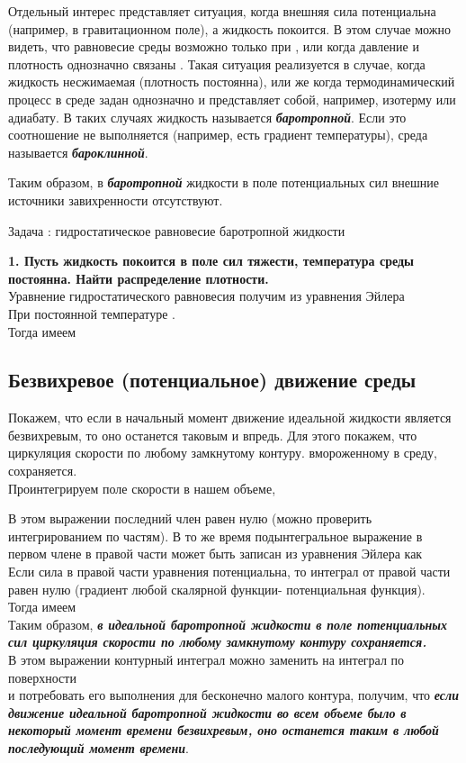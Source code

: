 \documentclass[
]{article}
\begin{document}
Отдельный интерес представляет ситуация, когда внешняя сила потенциальна
(например, в гравитационном поле), а жидкость покоится. В этом случае
можно видеть, что равновесие среды возможно только при {}, или когда
давление и плотность однозначно связаны {}. Такая ситуация реализуется в
случае, когда жидкость несжимаемая (плотность постоянна), или же когда
термодинамический процесс в среде задан однозначно и представляет собой,
например, изотерму или адиабату. В таких случаях жидкость называется
\textbf{\emph{баротропной}}. Если это соотношение не выполняется
(например, есть градиент температуры), среда называется
\textbf{\emph{бароклинной}}.

Таким образом, в \textbf{\emph{баротропной}} жидкости в поле
потенциальных сил внешние источники завихренности отсутствуют.

Задача : гидростатическое равновесие баротропной жидкости

\textbf{1. Пусть жидкость покоится в поле сил тяжести, температура среды
постоянна. Найти распределение плотности.}\\
Уравнение гидростатического равновесия получим из уравнения Эйлера\\
{}При постоянной температуре {}.\\
Тогда имеем {}{}

\subsection{Безвихревое (потенциальное) движение
среды}\label{ux431ux435ux437ux432ux438ux445ux440ux435ux432ux43eux435-ux43fux43eux442ux435ux43dux446ux438ux430ux43bux44cux43dux43eux435-ux434ux432ux438ux436ux435ux43dux438ux435-ux441ux440ux435ux434ux44b}

Покажем, что если в начальный момент движение идеальной жидкости
является безвихревым, то оно останется таковым и впредь. Для этого
покажем, что циркуляция скорости по любому замкнутому контуру.
вмороженному в среду, сохраняется.\\
Проинтегрируем поле скорости в нашем объеме,

{}В этом выражении последний член равен нулю (можно проверить
интегрированием по частям). В то же время подынтегральное выражение в
первом члене в правой части может быть записан из уравнения Эйлера как\\
{}Если сила в правой части уравнения потенциальна, то интеграл от правой
части равен нулю (градиент любой скалярной функции- потенциальная
функция).\\
Тогда имеем\\
{}Таким образом, \textbf{\emph{в идеальной баротропной жидкости в поле
потенциальных сил циркуляция скорости по любому замкнутому контуру
сохраняется.}}\\
В этом выражении контурный интеграл можно заменить на интеграл по
поверхности\\
{} и потребовать его выполнения для бесконечно малого контура, получим,
что \textbf{\emph{если движение идеальной баротропной жидкости во всем
объеме было в некоторый момент времени безвихревым, оно останется таким
в любой последующий момент времени}}.
\end{document}
